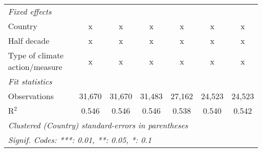 \begin{tabular}{lcccccc}
   \emph{Fixed effects}\\
   Country                                         & x       & x       & x       & x            & x             & x\\  
   Half decade                                     & x       & x       & x       & x            & x             & x\\  
   Type of climate action/measure                  & x       & x       & x       & x            & x             & x\\  
   \midrule \emph{Fit statistics}\\
   Observations                                    & 31,670  & 31,670  & 31,483  & 27,162       & 24,523        & 24,523\\  
   R$^2$                                           & 0.546   & 0.546   & 0.546   & 0.538        & 0.540         & 0.542\\  
   \midrule
   \multicolumn{7}{l}{\emph{Clustered (Country) standard-errors in parentheses}}\\
   \multicolumn{7}{l}{\emph{Signif. Codes: ***: 0.01, **: 0.05, *: 0.1}}\\
\end{tabular}
\par\endgroup


